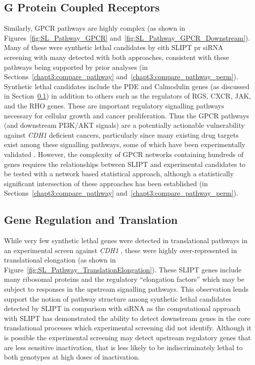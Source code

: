 \FloatBarrier

\subsection{G Protein Coupled Receptors}  \label{chapt4:SL_Genes_GPCR}

Similarly, \acrfull{GPCR} pathways are highly complex (as shown in Figures~\ref{fig:SL_Pathway_GPCR} and~\ref{fig:SL_Pathway_GPCR_Downstream}). Many of these were synthetic lethal candidates by eith \gls{SLIPT} pr \gls{siRNA} screening with many detected with both approaches, consistent with these pathways being supported by prior analyses (in Sections~\ref{chapt3:compare_pathway} and~\ref{chapt3:compare_pathway_perm}). Synthetic lethal candidates include the \gls{PDE} and Calmodulin genes (as discussed in Section~\ref{chapt4:SL_Genes_GPCR}) in addition to others such as the regulators of \gls{RGS}, \gls{CXCR}, \acrfull{JAK}, and the \gls{RHO} genes. These are important regulatory signalling pathways necessary for cellular growth and cancer proliferation. Thus the GPCR pathways (and downstream PI3K/AKT signals) are a potentially actionable vulnerability against \textit{CDH1} deficient cancers, particularly since many existing drug targets exist among these signalling pathways, some of which have been experimentally validated \citep{Telford2015, KellyHDGC}. However, the complexity of GPCR networks containing hundreds of genes requires the relationships between \gls{SLIPT} and experimental candidates to be tested with a network based statistical approach, although a statistically significant intersection of these approaches has been established (in Sections~\ref{chapt3:compare_pathway} and~\ref{chapt3:compare_pathway_perm}).



\FloatBarrier

\subsection{Gene Regulation and Translation}  \label{chapt4:SL_Genes_Translation}

While very few synthetic lethal genes were detected in translational pathways in an experimental screen against \textit{CDH1} \cite{Telford2015}, these were highly over-represented in translational elongation (as shown in Figure~\ref{fig:SL_Pathway_TranslationElongation}). These \gls{SLIPT} genes include many ribosomal proteins and the regulatory ``elongation factors'' which may be subject to responses in the upstream signalling pathways. This observation lends support the notion of pathway structure among synthetic lethal candidates detected by \gls{SLIPT} in comparison with \gls{siRNA} as the computational approach with \gls{SLIPT} has demonstrated the ability to detect downstream genes in the core translational processes which experimental screening did not identify. Although it is possible the experimental screening may detect upstream regulatory genes that are less sensitive inactivation, that is less likely to be indiscriminately lethal to both genotypes at high doses of inactivation.

